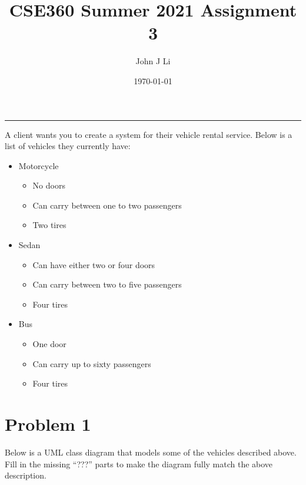 \documentclass{article}
\title{CSE360 Summer 2021 Assignment 3}
\date{\today}
\author{John J Li}
\begin{document}
    \maketitle
    \thispagestyle{empty}
    \noindent\rule{\textwidth}{0.8pt}

    A client wants you to create a system for their vehicle rental service. Below is a list of vehicles
    they currently have:
    \begin{itemize}
        \item 
        Motorcycle
        \begin{itemize}
            \item 
            No doors
            \item
            Can carry between one to two passengers
            \item
            Two tires
        \end{itemize}
        \item 
        Sedan
        \begin{itemize}
            \item 
            Can have either two or four doors
            \item
            Can carry between two to five passengers
            \item
            Four tires
        \end{itemize}
        \item 
        Bus
        \begin{itemize}
            \item 
            One door
            \item
            Can carry up to sixty passengers
            \item
            Four tires
        \end{itemize}
    \end{itemize}


    \section*{Problem 1}

    Below is a UML class diagram that models some of the vehicles described above. Fill in
    the missing “???” parts to make the diagram fully match the above description.
\end{document}
